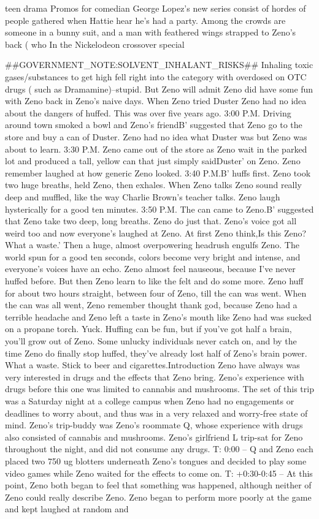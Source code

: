 \documentclass[12pt]{book}
\begin{document}
teen drama Promos for comedian George Lopez's new series consist of hordes of people gathered when Hattie hear he's had a party. Among the crowds are someone in a bunny suit, and a man with feathered wings strapped to Zeno's back ( who In the Nickelodeon crossover special



\#\#GOVERNMENT\_NOTE:SOLVENT\_INHALANT\_RISKS\#\# Inhaling toxic gases/substances to get high fell right into the category with overdosed on OTC drugs ( such as Dramamine)--stupid. But Zeno will admit Zeno did have some fun with Zeno back in Zeno's naive days. When Zeno tried Duster Zeno had no idea about the dangers of huffed. This was over five years ago. 3:00 P.M. Driving around town smoked a bowl and Zeno's friendB' suggested that Zeno go to the store and buy a can of Duster. Zeno had no idea what Duster was but Zeno was about to learn. 3:30 P.M. Zeno came out of the store as Zeno wait in the parked lot and produced a tall, yellow can that just simply saidDuster' on Zeno. Zeno remember laughed at how generic Zeno looked. 3:40 P.M.B' huffs first. Zeno took two huge breaths, held Zeno, then exhales. When Zeno talks Zeno sound really deep and muffled, like the way Charlie Brown's teacher talks. Zeno laugh hysterically for a good ten minutes. 3:50 P.M. The can came to Zeno.B' suggested that Zeno take two deep, long breaths. Zeno do just that. Zeno's voice got all weird too and now everyone's laughed at Zeno. At first Zeno think,Is this Zeno? What a waste.' Then a huge, almost overpowering headrush engulfs Zeno. The world spun for a good ten seconds, colors become very bright and intense, and everyone's voices have an echo. Zeno almost feel nauseous, because I've never huffed before. But then Zeno learn to like the felt and do some more. Zeno huff for about two hours straight, between four of Zeno, till the can was went. When the can was all went, Zeno remember thought thank god, because Zeno had a terrible headache and Zeno left a taste in Zeno's mouth like Zeno had was sucked on a propane torch. Yuck. Huffing can be fun, but if you've got half a brain, you'll grow out of Zeno. Some unlucky individuals never catch on, and by the time Zeno do finally stop huffed, they've already lost half of Zeno's brain power. What a waste. Stick to beer and cigarettes.Introduction Zeno have always was very interested in drugs and the effects that Zeno bring. Zeno's experience with drugs before this one was limited to cannabis and mushrooms. The set of this trip was a Saturday night at a college campus when Zeno had no engagements or deadlines to worry about, and thus was in a very relaxed and worry-free state of mind. Zeno's trip-buddy was Zeno's roommate Q, whose experience with drugs also consisted of cannabis and mushrooms. Zeno's girlfriend L trip-sat for Zeno throughout the night, and did not consume any drugs. T: 0:00 -- Q and Zeno each placed two 750 ug blotters underneath Zeno's tongues and decided to play some video games while Zeno waited for the effects to come on. T: +0:30-0:45 -- At this point, Zeno both began to feel that something was happened, although neither of Zeno could really describe Zeno. Zeno began to perform more poorly at the game and kept laughed at random and 
\end{document}
